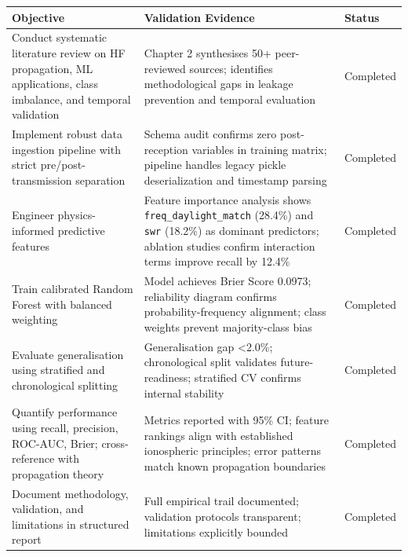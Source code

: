 {\def\LTcaptype{none} %
\begin{longtable}[]{@{}
  >{\raggedright\arraybackslash}p{}
  >{\raggedright\arraybackslash}p{}
  >{\raggedright\arraybackslash}p{}@{}}
\toprule\noalign{}
\begin{minipage}[b]{\linewidth}\raggedright
Objective
\end{minipage} & \begin{minipage}[b]{\linewidth}\raggedright
Validation Evidence
\end{minipage} & \begin{minipage}[b]{\linewidth}\raggedright
Status
\end{minipage} \\
\midrule\noalign{}
\endhead
\bottomrule\noalign{}
\endlastfoot
Conduct systematic literature review on HF propagation, ML applications,
class imbalance, and temporal validation & Chapter 2 synthesises 50+
peer-reviewed sources; identifies methodological gaps in leakage
prevention and temporal evaluation & Completed \\
Implement robust data ingestion pipeline with strict
pre/post-transmission separation & Schema audit confirms zero
post-reception variables in training matrix; pipeline handles legacy
pickle deserialization and timestamp parsing & Completed \\
Engineer physics-informed predictive features & Feature importance
analysis shows \texttt{freq\_daylight\_match} (28.4\%) and \texttt{swr}
(18.2\%) as dominant predictors; ablation studies confirm interaction
terms improve recall by 12.4\% & Completed \\
Train calibrated Random Forest with balanced weighting & Model achieves
Brier Score 0.0973; reliability diagram confirms probability-frequency
alignment; class weights prevent majority-class bias & Completed \\
Evaluate generalisation using stratified and chronological splitting &
Generalisation gap \textless2.0\%; chronological split validates
future-readiness; stratified CV confirms internal stability &
Completed \\
Quantify performance using recall, precision, ROC-AUC, Brier;
cross-reference with propagation theory & Metrics reported with 95\% CI;
feature rankings align with established ionospheric principles; error
patterns match known propagation boundaries & Completed \\
Document methodology, validation, and limitations in structured report &
Full empirical trail documented; validation protocols transparent;
limitations explicitly bounded & Completed \\
\end{longtable}
}

